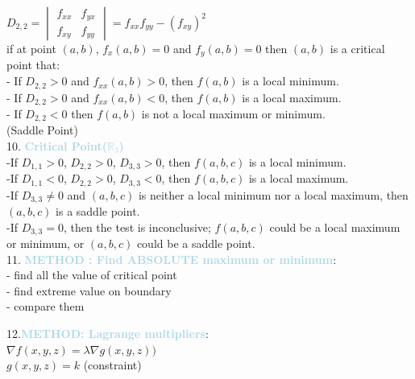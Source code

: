 \documentclass[twocolumn]{article}
\newcommand{\method}[1]{\textbf{\textcolor{lightblue}{#1}}}
\newcommand{\sectionspace}{\vspace*{1em}}
\newcommand{\properties}[1]{\textbf{\textcolor{rosered}{#1}}}
\begin{document}
$
D_{2,2} = \begin{vmatrix}
	f_{xx} & f_{yx} \\
	f_{xy} & f_{yy}
\end{vmatrix}
= f_{xx}f_{yy} - (f_{xy})^2
$\\
if at point $(a,b)$, $f_{x}(a,b) = 0$ and $f_{y}(a,b) = 0$ then $(a, b)$ is a critical point that:\\
- If $D_{2,2} > 0$ and $f_{xx}(a, b) > 0$, then $f(a, b)$ is a local minimum.\\
- If $D_{2,2} > 0$ and $f_{xx}(a, b) < 0$, then $f(a, b)$ is a local maximum.\\
- If $D_{2,2} < 0$ then $f(a, b)$ is not a local maximum or minimum.\\
(Saddle Point)\\

10. \method{Critical Point(\properties{$\mathbb{R}_{3}$})}\\

-If \( D_{1,1} > 0 \), \( D_{2,2} > 0 \), \( D_{3,3} > 0 \), then \( f(a, b, c) \) is a local minimum.\\
-If \( D_{1,1} < 0 \), \( D_{2,2} > 0 \), \( D_{3,3} < 0 \), then \( f(a, b, c) \) is a local maximum.\\
-If \( D_{3,3} \neq 0 \) and \( (a, b, c) \) is neither a local minimum nor a local maximum, then \( (a, b, c) \) is a saddle point.\\
-If \( D_{3,3} = 0 \), then the test is inconclusive; \( f(a, b, c) \) could be a local maximum or minimum, or \( (a, b, c) \) could be a saddle point.\\





11. \method{METHOD : Find ABSOLUTE maximum or minimum}:\\
- find all the value of critical point\\
- find extreme value on boundary\\
- compare them\\

\sectionspace
\sectionspace

12.\method{METHOD: Lagrange multipliers}:\\
$\nabla f(x,y,z) = \lambda \nabla g(x,y,z))$\\
$g(x, y, z) = k$ (constraint)

\sectionspace
\end{document}
